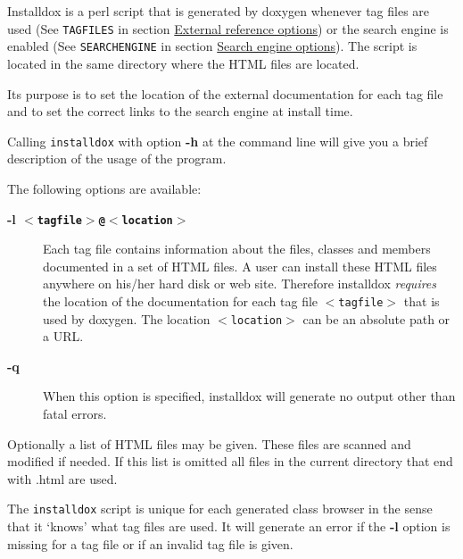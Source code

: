 Installdox is a perl script that is generated by doxygen whenever tag files are used (See {\tt TAGFILES} in section \hyperlink{config_config_extref}{External reference options}) or the search engine is enabled (See {\tt SEARCHENGINE} in section \hyperlink{config_config_search}{Search engine options}). The script is located in the same directory where the HTML files are located.

Its purpose is to set the location of the external documentation for each tag file and to set the correct links to the search engine at install time.

Calling {\tt installdox} with option {\bf -h} at the command line will give you a brief description of the usage of the program.

The following options are available: \begin{description}
\item[{\bf -l {\tt $<$tagfile$>$@$<$location$>$}}]Each tag file contains information about the files, classes and members documented in a set of HTML files. A user can install these HTML files anywhere on his/her hard disk or web site. Therefore installdox {\em requires\/} the location of the documentation for each tag file {\tt $<$tagfile$>$} that is used by doxygen. The location {\tt $<$location$>$} can be an absolute path or a URL.

\item[{\bf -q}]When this option is specified, installdox will generate no output other than fatal errors. \end{description}
Optionally a list of HTML files may be given. These files are scanned and modified if needed. If this list is omitted all files in the current directory that end with {\tt }.html are used.

The {\tt installdox} script is unique for each generated class browser in the sense that it `knows' what tag files are used. It will generate an error if the {\bf -l} option is missing for a tag file or if an invalid tag file is given. 